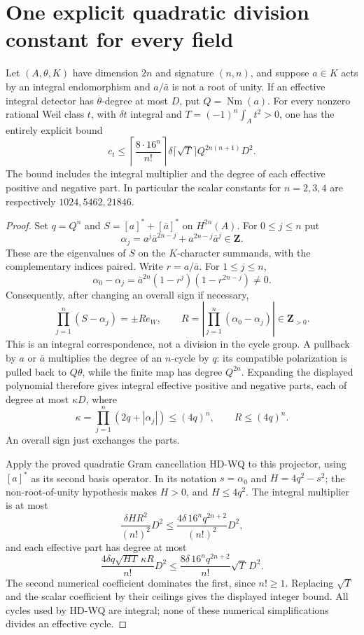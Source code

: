 \section{One explicit quadratic division constant for every field}

\begin{proposition}
\label{HD-U}
Let $(A,\theta,K)$ have dimension $2n$ and signature $(n,n)$,
and suppose $a\in K$ acts by an integral endomorphism and
$a/\bar a$ is not a root of unity. If an effective integral
detector has $\theta$-degree at most $D$, put $Q=\operatorname{Nm}(a)$.
For every nonzero rational Weil class $t$, with $\delta t$ integral
and $T=(-1)^n\int_A t^2>0$, one has the entirely explicit bound
\[
 \boxed{c_t\le
 \left\lceil\frac{8\cdot16^n}{n!}\right\rceil
 \delta\lceil\sqrt T\rceil Q^{2n(n+1)}D^2.}
\]
The bound includes the integral multiplier and the degree of each
effective positive and negative part. In particular the scalar
constants for $n=2,3,4$ are respectively $1024,5462,21846$.
\end{proposition}
\begin{proof}
Set $q=Q^n$ and $S=[a]^*+[\bar a]^*$ on $H^{2n}(A)$.
For $0\le j\le n$ put
\[
 \alpha_j=a^j\bar a^{2n-j}+a^{2n-j}\bar a^j\in\mathbf Z.
\]
These are the eigenvalues of $S$ on the $K$-character summands,
with the complementary indices paired. Write $r=a/\bar a$.
For $1\le j\le n$,
\[
 \alpha_0-\alpha_j=\bar a^{2n}(1-r^j)(1-r^{2n-j})\ne0.
\]
Consequently, after changing an overall sign if necessary,
\[
 \prod_{j=1}^n(S-\alpha_j)=\pm R e_W,
 \qquad R=\left|\prod_{j=1}^n(\alpha_0-\alpha_j)\right|
 \in\mathbf Z_{>0}.
\]
This is an integral correspondence, not a division in the cycle
group. A pullback by $a$ or $\bar a$ multiplies the degree of an
$n$-cycle by $q$: its compatible polarization is pulled back to
$Q\theta$, while the finite map has degree $Q^{2n}$.
Expanding the displayed polynomial therefore gives integral
effective positive and negative parts, each of degree at most
$\kappa D$, where
\[
 \kappa=\prod_{j=1}^n(2q+|\alpha_j|)\le(4q)^n,
 \qquad R\le(4q)^n.
\]
An overall sign just exchanges the parts.

Apply the proved quadratic Gram cancellation HD-WQ to this
projector, using $[a]^*$ as its second basis operator. In its
notation $s=\alpha_0$ and $H=4q^2-s^2$; the non-root-of-unity
hypothesis makes $H>0$, and $H\le4q^2$. The integral multiplier
is at most
\[
 \frac{\delta HR^2}{(n!)^2}D^2
 \le \frac{4\delta\,16^n q^{2n+2}}{(n!)^2}D^2,
\]
and each effective part has degree at most
\[
 \frac{4\delta q\sqrt{HT}\,\kappa R}{n!}D^2
 \le \frac{8\delta\,16^n q^{2n+2}}{n!}\sqrt T\,D^2.
\]
The second numerical coefficient dominates the first, since
$n!\ge1$. Replacing $\sqrt T$ and the scalar coefficient by
their ceilings gives the displayed integer bound. All cycles
used by HD-WQ are integral; none of these numerical simplifications
divides an effective cycle.
\end{proof}


